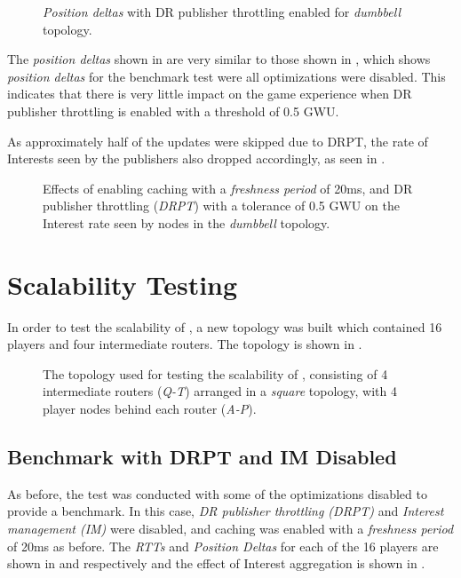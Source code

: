\begin{figure}[H]
    \centering
    \caption{\textit{Position deltas} with DR publisher throttling enabled for \textit{dumbbell} topology.}
    \label{fig:eval:caching:dr-pub-throt:pos-deltas:dumbbell}
\end{figure}

The \textit{position deltas} shown in  are very similar to those shown in , which shows \textit{position deltas} for the benchmark test were all optimizations were disabled. This indicates that there is very little impact on the game experience when DR publisher throttling is enabled with a threshold of 0.5 GWU.

As approximately half of the updates were skipped due to DRPT, the rate of Interests seen by the publishers also dropped accordingly, as seen in .

\begin{figure}[H]
    \centering
    \caption{Effects of enabling caching with a \textit{freshness period} of 20ms, and DR publisher throttling (\textit{DRPT}) with a tolerance of 0.5 GWU on the Interest rate seen by nodes in the \textit{dumbbell} topology.}
    \label{fig:eval:dr-pub-throt:dumbbell-interest-rates}
\end{figure}
 

\section{Scalability Testing}\label{sec:eval:scalability}
In order to test the scalability of \game{}, a new topology was built which contained 16 players and four intermediate routers. The topology is shown in .

\begin{figure}[H]
    \centering
    \caption{The topology used for testing the scalability of \game{}, consisting of 4 intermediate routers (\textit{Q-T}) arranged in a \textit{square} topology, with 4 player nodes behind each router (\textit{A-P}).}
    \label{fig:eval:scalability-topology}
\end{figure}

\subsection{Benchmark with DRPT and IM Disabled}
As before, the test was conducted with some of the optimizations disabled to provide a benchmark. In this case, \textit{DR publisher throttling (DRPT)} and \textit{Interest management (IM)} were disabled, and caching was enabled with a \textit{freshness period} of 20ms as before. The \textit{RTTs} and \textit{Position Deltas} for each of the 16 players are shown in  and  respectively and the effect of Interest aggregation is shown in .

